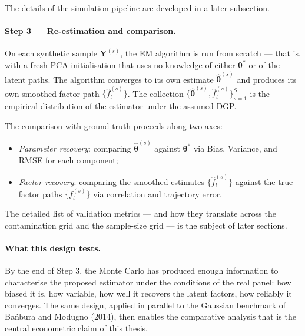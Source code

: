 \documentclass[11pt, a4paper, oneside]{article}
\newcommand{\mY}{\mathbf{Y}}
\newcommand{\btheta}{\boldsymbol{\theta}}
\begin{document}
The details of the simulation pipeline are developed in a later
subsection.

\paragraph{Step 3 — Re-estimation and comparison.}
On each synthetic sample $\mY^{(s)}$, the EM algorithm is run from
scratch — that is, with a fresh PCA initialisation that uses no
knowledge of either $\btheta^*$ or of the latent paths. The
algorithm converges to its own estimate $\hat{\btheta}^{(s)}$ and
produces its own smoothed factor path $\{\hat{f}_t^{(s)}\}$. The
collection $\{\hat{\btheta}^{(s)}, \hat{f}_t^{(s)}\}_{s=1}^{S}$ is
the empirical distribution of the estimator under the assumed DGP.

The comparison with ground truth proceeds along two axes:
\begin{itemize}[leftmargin=1.5em, itemsep=3pt]
    \item \emph{Parameter recovery}: comparing $\hat{\btheta}^{(s)}$
          against $\btheta^*$ via Bias, Variance, and RMSE for each
          component;
    \item \emph{Factor recovery}: comparing the smoothed estimates
          $\{\hat{f}_t^{(s)}\}$ against the true factor paths
          $\{f_t^{(s)}\}$ via correlation and trajectory error.
\end{itemize}
The detailed list of validation metrics — and how they translate
across the contamination grid and the sample-size grid — is the
subject of later sections.

\paragraph{What this design tests.}
By the end of Step 3, the Monte Carlo has produced enough information
to characterise the proposed estimator under the conditions of the
real panel: how biased it is, how variable, how well it recovers the
latent factors, how reliably it converges. The same design, applied
in parallel to the Gaussian benchmark of Ba\'nbura and Modugno
(2014), then enables the comparative analysis that is the central
econometric claim of this thesis.
\end{document}
